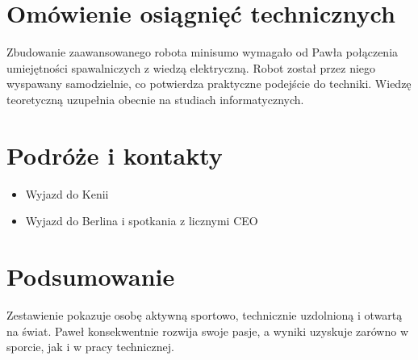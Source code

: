 \section*{Omówienie osiągnięć technicznych}
Zbudowanie zaawansowanego robota minisumo wymagało od Pawła połączenia umiejętności spawalniczych z wiedzą elektryczną. Robot został przez niego wyspawany samodzielnie, co potwierdza praktyczne podejście do techniki. Wiedzę teoretyczną uzupełnia obecnie na studiach informatycznych.

\section*{Podróże i kontakty}
\begin{itemize}
\item Wyjazd do Kenii
\item Wyjazd do Berlina i spotkania z licznymi CEO
\end{itemize}

\section*{Podsumowanie}
Zestawienie pokazuje osobę aktywną sportowo, technicznie uzdolnioną i otwartą na świat. Paweł konsekwentnie rozwija swoje pasje, a wyniki uzyskuje zarówno w sporcie, jak i w pracy technicznej.